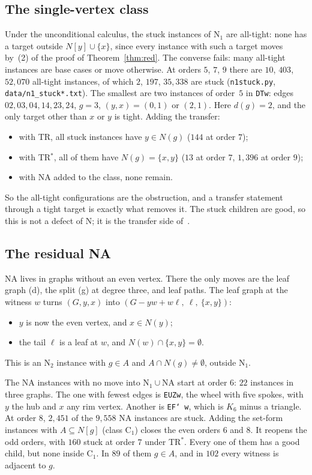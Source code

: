 \documentclass[11pt]{amsart}
\theoremstyle{definition}
\begin{document}
\subsection{The single-vertex class}
Under the unconditional calculus, the stuck instances of N$_1$ are all-tight: none has a target
outside $N[y]\cup\{x\}$, since every instance with such a target moves by~(2) of the proof of
Theorem~\ref{thm:red}. The converse fails: many all-tight instances are base cases or move
otherwise. At orders $5$, $7$, $9$ there are $10$, $403$, $52{,}070$ all-tight instances, of which
$2$, $197$, $35{,}338$ are stuck (\texttt{n1stuck.py}, \texttt{data/n1\_stuck*.txt}). The smallest
are two instances of order~$5$ in \texttt{DTw}: edges $02,03,04,14,23,24$, $g=3$, $(y,x)=(0,1)$ or
$(2,1)$. Here $d(g)=2$, and the only target other than $x$ or $y$ is tight. Adding the transfer:
\begin{itemize}
\item with TR, all stuck instances have $y\in N(g)$ ($144$ at order $7$);
\item with TR$^*$, all of them have $N(g)=\{x,y\}$ ($13$ at order $7$, $1{,}396$ at order $9$);
\item with NA added to the class, none remain.
\end{itemize}
So the all-tight configurations are the obstruction, and a transfer statement through a tight
target is exactly what removes it. The stuck children are good, so this is not a defect of N; it
is the transfer side of~\cite{L1I}.

\subsection{The residual NA}
NA lives in graphs without an even vertex. There the only moves are the leaf graph (d), the split
(g) at degree three, and leaf paths. The leaf graph at the witness $w$ turns $(G,y,x)$ into
$(G-yw+w\ell,\ \ell,\ \{x,y\})$:
\begin{itemize}
\item $y$ is now the even vertex, and $x\in N(y)$;
\item the tail $\ell$ is a leaf at $w$, and $N(w)\cap\{x,y\}=\emptyset$.
\end{itemize}
This is an N$_2$ instance with $g\in A$ and $A\cap N(g)\ne\emptyset$, outside N$_1$.

The NA instances with no move into N$_1\cup$NA start at order $6$: $22$ instances in three graphs.
The one with fewest edges is \texttt{EUZw}, the wheel with five spokes, with $y$ the hub and $x$ any
rim vertex. Another is \texttt{EF\char`~w}, which is $K_6$ minus a triangle. At order $8$, $2{,}451$
of the $9{,}558$ NA instances are stuck. Adding the set-form instances with $A\subseteq N[g]$ (class
C$_1$) closes the even orders $6$ and $8$. It reopens the odd orders, with $160$ stuck at order $7$
under TR$^*$. Every one of them has a good child, but none
inside C$_1$. In $89$ of them $g\in A$, and in $102$ every witness is adjacent to $g$.
\end{document}
